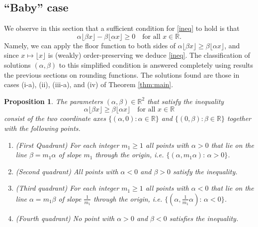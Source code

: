 \documentclass[12pt,letterpaper, reqno]{amsart}
\newtheorem{prop}[thm]{Proposition}
\theoremstyle{definition}
\theoremstyle{remark}
\newcommand{\RR}{\ensuremath{\mathbb{R}}}
\newcommand{\floor}[1]{\lfloor{#1}\rfloor}
\begin{document}
\subsection{``Baby'' case}\label{sec:baby}
We observe in this section that a sufficient condition for \eqref{ineq} to hold is that
\begin{equation}\label{eq:baby}
{\alpha \floor{\beta x}} -  {\beta \floor{\alpha  x}} \ge 0 \quad \text{for all }  x \in \RR .
\end{equation}
Namely,  we can apply the floor function to both sides of ${\alpha \floor{\beta x}} \ge  {\beta \floor{\alpha  x}}$,
and since  $x\mapsto\floor x$ is (weakly) order-preserving we deduce \eqref{ineq}.
The classification of solutions $(\alpha,\beta)$ to this simplified condition is answered completely 
using results  the previous sections on rounding functions. 
The solutions found  are those in  cases (i-a), (ii), (iii-a), and (iv) of Theorem \ref{thm:main}.



\begin{prop}\label{prop:24}
The parameters  $(\alpha, \beta) \in \RR^2$  that satisfy the inequality
$$ \alpha \floor{ \beta x}  \geq  \beta \floor{ \alpha x} 
\quad \mbox{for all } x \in \RR
$$
consist of the two coordinate axes $\{(\alpha, 0): \alpha  \in \RR \}$
and $\{ (0, \beta):  \beta \in \RR\}$ together with  the following points. 
\begin{enumerate}
\item[(i)] 
{\rm (First Quadrant)}  For each integer $m_1 \ge 1$ all points with $\alpha >0$ that lie on the line $\beta= m_1 \alpha$ of slope $m_1$ through the origin,
i.e. $\{ (\alpha, m_1 \alpha): \, \alpha >0\}$.
\item[(ii)] {\rm (Second quadrant)} All points with $\alpha <0$ and $\beta >0$ satisfy the inequality.
\item[(iii)] {\rm (Third quadrant)}  For each integer $ m_1 \ge 1$ all points with $\alpha <0$ that lie on the line $\alpha=m_1\beta$
of slope $\frac{1}{m_1}$ through the origin,
i.e. $\{ (\alpha,  \frac{1}{m_1} \alpha): \, \alpha <0\}$.
\item[(iv)] {\rm (Fourth quadrant)} No point with $\alpha >0$ and $\beta <0$ satisfies the inequality.

\end{enumerate}
\end{prop}
\end{document}

